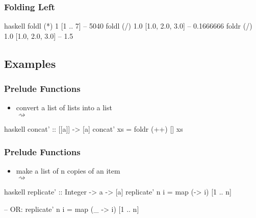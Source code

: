 \documentclass[dvipsnames]{beamer}
\theoremstyle{plain}
\begin{document}
\begin{frame}[fragile]
  \frametitle{Folding Left}

  \begin{exampleblock}{}
    \begin{pygments}{haskell}
foldl (*) 1 [1 .. 7]           -- 5040
foldl (/) 1.0 [1.0, 2.0, 3.0]  -- 0.1666666
foldr (/) 1.0 [1.0, 2.0, 3.0]  -- 1.5
    \end{pygments}
  \end{exampleblock}
\end{frame}

\subsection{Examples}

\begin{frame}[fragile]
  \frametitle{Prelude Functions}

  \begin{itemize}
    \item convert a list of lists into a list\\
      \pygment{haskell}{concat [[2, 3], [], [4]} $\rightsquigarrow$
  \end{itemize}

  \begin{exampleblock}{}
    \begin{pygments}{haskell}
concat' :: [[a]] -> [a]
concat' xs = foldr (++) [] xs
    \end{pygments}
  \end{exampleblock}
\end{frame}

\begin{frame}[fragile]
  \frametitle{Prelude Functions}

  \begin{itemize}
    \item make a list of n copies of an item\\
       $\rightsquigarrow$
  \end{itemize}

  \begin{exampleblock}{}
    \begin{pygments}{haskell}
replicate' :: Integer -> a -> [a]
replicate' n i = map (\x -> i) [1 .. n]

-- OR:
replicate' n i = map (\_ -> i) [1 .. n]
    \end{pygments}
  \end{exampleblock}
\end{frame}
\end{document}
